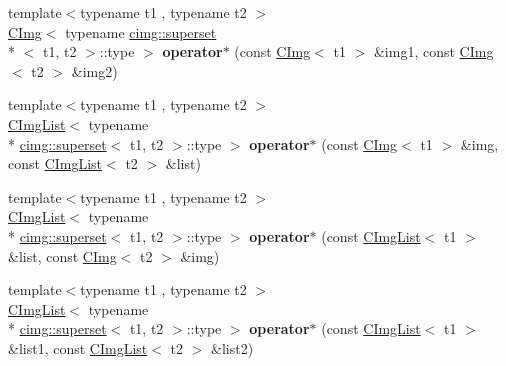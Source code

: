 \begin{DoxyCompactItemize}
\item 
\hypertarget{namespacecimg__library_ac47fd5d3f2f586fe5540cc436511314f}{{\footnotesize template$<$typename t1 , typename t2 $>$ }\\\hyperlink{structcimg__library_1_1_c_img}{C\-Img}$<$ typename \hyperlink{structcimg__library_1_1cimg_1_1superset}{cimg\-::superset}\\*
$<$ t1, t2 $>$\-::type $>$ {\bfseries operator$\ast$} (const \hyperlink{structcimg__library_1_1_c_img}{C\-Img}$<$ t1 $>$ \&img1, const \hyperlink{structcimg__library_1_1_c_img}{C\-Img}$<$ t2 $>$ \&img2)}\label{namespacecimg__library_ac47fd5d3f2f586fe5540cc436511314f}

\item 
\hypertarget{namespacecimg__library_a1f672b3e21d50902c476742569f2e6b0}{{\footnotesize template$<$typename t1 , typename t2 $>$ }\\\hyperlink{structcimg__library_1_1_c_img_list}{C\-Img\-List}$<$ typename \\*
\hyperlink{structcimg__library_1_1cimg_1_1superset}{cimg\-::superset}$<$ t1, t2 $>$\-::type $>$ {\bfseries operator$\ast$} (const \hyperlink{structcimg__library_1_1_c_img}{C\-Img}$<$ t1 $>$ \&img, const \hyperlink{structcimg__library_1_1_c_img_list}{C\-Img\-List}$<$ t2 $>$ \&list)}\label{namespacecimg__library_a1f672b3e21d50902c476742569f2e6b0}

\item 
\hypertarget{namespacecimg__library_a97def5fda9d69d3a74e7d5040d421898}{{\footnotesize template$<$typename t1 , typename t2 $>$ }\\\hyperlink{structcimg__library_1_1_c_img_list}{C\-Img\-List}$<$ typename \\*
\hyperlink{structcimg__library_1_1cimg_1_1superset}{cimg\-::superset}$<$ t1, t2 $>$\-::type $>$ {\bfseries operator$\ast$} (const \hyperlink{structcimg__library_1_1_c_img_list}{C\-Img\-List}$<$ t1 $>$ \&list, const \hyperlink{structcimg__library_1_1_c_img}{C\-Img}$<$ t2 $>$ \&img)}\label{namespacecimg__library_a97def5fda9d69d3a74e7d5040d421898}

\item 
\hypertarget{namespacecimg__library_a8d9555ead8682e069c8f73df710ad3ed}{{\footnotesize template$<$typename t1 , typename t2 $>$ }\\\hyperlink{structcimg__library_1_1_c_img_list}{C\-Img\-List}$<$ typename \\*
\hyperlink{structcimg__library_1_1cimg_1_1superset}{cimg\-::superset}$<$ t1, t2 $>$\-::type $>$ {\bfseries operator$\ast$} (const \hyperlink{structcimg__library_1_1_c_img_list}{C\-Img\-List}$<$ t1 $>$ \&list1, const \hyperlink{structcimg__library_1_1_c_img_list}{C\-Img\-List}$<$ t2 $>$ \&list2)}\label{namespacecimg__library_a8d9555ead8682e069c8f73df710ad3ed}


\end{DoxyCompactItemize}
